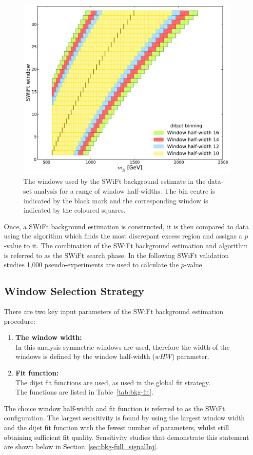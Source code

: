 \begin{figure}[!htb]
\centering
\includegraphics[width=0.6\linewidth, angle=0]{figs/Dibjet/LowMass/evt-swiftBins_min566_fl0_fh0_tr0.pdf}
\caption{\label{fig:bkg-lm_swiftBins}
  The windows used by the SWiFt background estimate in the \lm{} data-set analysis for a range of window half-widths.
  The bin centre is indicated by the black mark and the corresponding window is indicated by the coloured squares.}
\end{figure}

Once, a SWiFt background estimation is constructed,
it is then compared to data using the \bh{} algorithm which finds the most discrepant excess region and assigns a \mbox{$p$-value} to it.
The combination of the SWiFt background estimation and \bh{} algorithm is referred to as the SWiFt search phase.
In the following SWiFt validation studies 1,000 pseudo-experiments are used to calculate the \bh{} \mbox{$p$-value}.

\subsection{Window Selection Strategy}
\label{sec:bkg-full_windowSel}

There are two key input parameters of the SWiFt background estimation procedure:
\begin{enumerate}[leftmargin=*]
\item \textbf{The window width:}\\
  In this analysis symmetric windows are used, therefore the width of the windows is defined by the window half-width ($wHW$) parameter.\vspace{0.5em}
\item \textbf{Fit function:}\\
  The dijet fit functions are used, as used in the global fit strategy. \\
  The functions are listed in Table~\ref{tab:bkg-fit}.
\end{enumerate}
The choice window half-width and fit function is referred to as the SWiFt configuration.
The largest sensitivity is found by using the largest window width and the dijet fit function with the fewest number of parameters, whilst still obtaining sufficient fit quality.
Sensitivity studies that demonstrate this statement are shown below in Section~\ref{sec:bkg-full_signalInj}.


